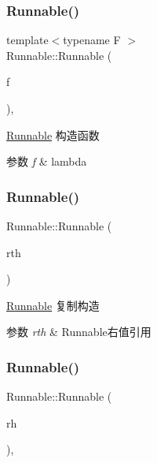 \subsubsection{\texorpdfstring{Runnable()}{Runnable()}\hspace{0.1cm}{\footnotesize\ttfamily [1/3]}}
{\footnotesize\ttfamily template$<$typename F $>$ \\
Runnable\+::\+Runnable (\begin{DoxyParamCaption}\item[{F \&\&}]{f }\end{DoxyParamCaption})\hspace{0.3cm}{\ttfamily [inline]}, {\ttfamily [explicit]}}



\hyperlink{classRunnable}{Runnable} 构造函数 


\begin{DoxyParams}{参数}
{\em f} & lambda \\
\hline
\end{DoxyParams}
\mbox{\label{classRunnable_ab2054720a62d059c59d0e8085d3be78e}} 
\subsubsection{\texorpdfstring{Runnable()}{Runnable()}\hspace{0.1cm}{\footnotesize\ttfamily [2/3]}}
{\footnotesize\ttfamily Runnable\+::\+Runnable (\begin{DoxyParamCaption}\item[{\hyperlink{classRunnable}{Runnable} \&\&}]{rth }\end{DoxyParamCaption})\hspace{0.3cm}{\ttfamily [inline]}}



\hyperlink{classRunnable}{Runnable} 复制构造 


\begin{DoxyParams}{参数}
{\em rth} & Runnable右值引用 \\
\hline
\end{DoxyParams}
\mbox{\label{classRunnable_a9e4d88b5d30d6e0368c5d22a0df203ee}} 
\subsubsection{\texorpdfstring{Runnable()}{Runnable()}\hspace{0.1cm}{\footnotesize\ttfamily [3/3]}}
{\footnotesize\ttfamily Runnable\+::\+Runnable (\begin{DoxyParamCaption}\item[{\hyperlink{classRunnable}{Runnable} \&}]{rh }\end{DoxyParamCaption})\hspace{0.3cm}{\ttfamily [inline]}, {\ttfamily [explicit]}}



